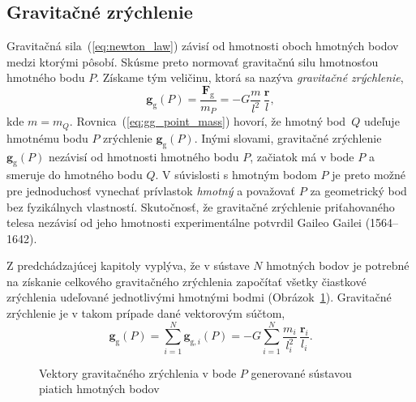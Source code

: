 \documentclass[a4paper, 12pt]{book}
\newcommand{\gidx}{\mathrm g}
\let\vec\mathbf
\begin{document}
\subsection{Gravitačné zrýchlenie}
\label{sec:gg}

Gravitačná sila~(\ref{eq:newton_law}) závisí od hmotnosti oboch hmotných 
bodov medzi ktorými pôsobí.  Skúsme preto normovať gravitačnú silu hmotnosťou 
hmotného bodu $P$.  Získame tým veličinu, ktorá sa nazýva \emph{gravitačné 
zrýchlenie},
%
\begin{equation}
\label{eq:gg_point_mass}
\vec g_\gidx(P) = \frac{\vec F_\gidx}{m_P} = -G \frac{m}{l^2} \, \frac{\vec 
r}{l}{,}
\end{equation}
%
kde $m = m_Q$.  Rovnica~(\ref{eq:gg_point_mass}) hovorí, že hmotný 
bod~$Q$ udeľuje hmotnému bodu $P$ zrýchlenie $\vec g_\gidx(P)$.   Inými 
slovami, gravitačné zrýchlenie $\vec g_\gidx(P)$ nezávisí od hmotnosti hmotného 
bodu $P$, začiatok má v bode $P$ a smeruje do hmotného bodu $Q$.  V súvislosti 
s hmotným bodom $P$ je preto možné pre jednoduchosť vynechať prívlastok 
\emph{hmotný} a považovať $P$ za geometrický bod bez fyzikálnych vlastností.  
Skutočnosť, že gravitačné zrýchlenie priťahovaného telesa nezávisí od jeho 
hmotnosti experimentálne potvrdil Gaileo Gailei (1564--1642).

Z predchádzajúcej kapitoly vyplýva, že v sústave $N$ hmotných bodov je potrebné 
na získanie celkového gravitačného zrýchlenia započítať všetky čiastkové 
zrýchlenia udeľované jednotlivými hmotnými bodmi 
(Obrázok~\ref{fig:gg_n_point_masses}).  Gravitačné zrýchlenie je v takom 
prípade dané vektorovým súčtom,
%
\begin{equation}
\label{eq:gg_N_point_masses}
\vec g_\gidx(P) = \sum_{i = 1}^{N}\vec g_{\gidx,i}(P) = -G \sum_{i = 1}^{N} 
\frac{m_i}{l_i^2} \, \frac{\vec r_i}{l_i}{.}
\end{equation}

\begin{figure}[b]
\centering

\caption{Vektory gravitačného zrýchlenia v bode $P$ generované sústavou piatich 
hmotných bodov}
\label{fig:gg_n_point_masses}
\end{figure}
\end{document}
